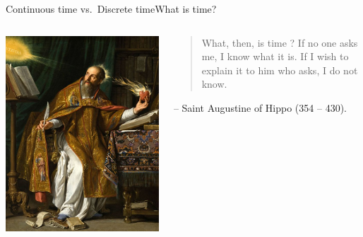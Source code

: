 \documentclass[usenames,dvipsnames,svgnames,10pt,aspectratio=169]{beamer}
\begin{document}
\begin{frame}[t, c]{Continuous time vs.\ Discrete time}{What is time?}
	\begin{columns}
		\begin{column}{.3\textwidth}
			\centering
			\includegraphics[width=.9\textwidth]{Saint_Augustin}
		\end{column}
		\begin{column}{.6\textwidth}
			\begin{quote}
				What, then, is time ? If no one asks me, I know what it is. If I wish to explain it to him who asks, I do not know.
			\end{quote}
			\begin{flushright}
				-- Saint Augustine of Hippo (354 -- 430).
			\end{flushright}
		\end{column}
	\end{columns}
\end{frame}
\end{document}
